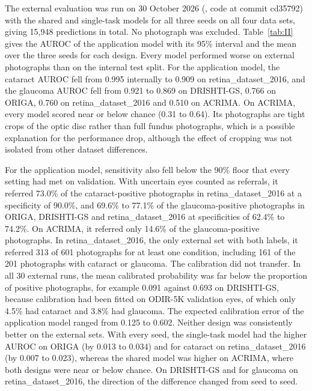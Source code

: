 \documentclass[conference,a4paper]{IEEEtran}
\begin{document}
The external evaluation was run on 30 October 2026 (,
code at commit cd35792) with the shared and single-task models for all three seeds on all four data
sets, giving 15,948 predictions in total. No photograph was excluded. Table~\ref{tab:II} gives the
AUROC of the application model with its 95\% interval and the mean over the three seeds for each
design. Every model performed worse on external photographs than on the internal test split. For the
application model, the cataract AUROC fell from 0.995 internally to 0.909 on retina\_dataset\_2016,
and the glaucoma AUROC fell from 0.921 to 0.869 on DRISHTI-GS, 0.766 on ORIGA, 0.760 on
retina\_dataset\_2016 and 0.510 on ACRIMA. On ACRIMA, every model scored near or below chance (0.31
to 0.64). Its photographs are tight crops of the optic disc rather than full fundus photographs,
 which is a possible explanation for the performance drop, although the effect of cropping was not isolated from other dataset differences.

For the application model, sensitivity also fell below the 90\% floor that every setting had met on
validation. With uncertain eyes counted as referrals, it referred 73.0\% of the cataract-positive
photographs in retina\_dataset\_2016 at a specificity of 90.0\%, and 69.6\% to 77.1\% of the
glaucoma-positive photographs in ORIGA, DRISHTI-GS and retina\_dataset\_2016 at specificities of
62.4\% to 74.2\%. On ACRIMA, it referred only 14.6\% of the glaucoma-positive photographs. In
retina\_dataset\_2016, the only external set with both labels, it referred 313 of 601 photographs
for at least one condition, including 161 of the 201 photographs with cataract or glaucoma. The
calibration did not transfer. In all 30 external runs, the mean calibrated probability was far below
the proportion of positive photographs, for example 0.091 against 0.693 on DRISHTI-GS, because
calibration had been fitted on ODIR-5K validation eyes, of which only 4.5\% had cataract and 3.8\%
had glaucoma. The expected calibration error of the application model ranged from 0.125 to 0.602.
Neither design was consistently better on the external sets. With every seed, the single-task model
had the higher AUROC on ORIGA (by 0.013 to 0.034) and for cataract on retina\_dataset\_2016 (by
0.007 to 0.023), whereas the shared model was higher on ACRIMA, where both designs were near or
below chance. On DRISHTI-GS and for glaucoma on retina\_dataset\_2016, the direction of the
difference changed from seed to seed.
\end{document}
